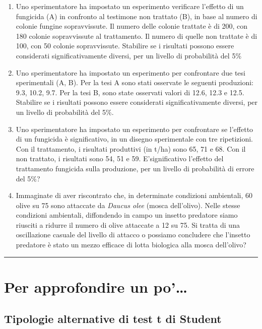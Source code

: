 \documentclass[a4paper,12pt,oneside]{book}
\providecommand{\tightlist}{%
  \setlength{\itemsep}{0pt}\setlength{\parskip}{0pt}}
\begin{document}
\begin{enumerate}
\def\labelenumi{\arabic{enumi}.}
\tightlist
\item
  Uno sperimentatore ha impostato un esperimento verificare l'effetto di un fungicida (A) in confronto al testimone non trattato (B), in base al numero di colonie fungine sopravvissute. Il numero delle colonie trattate è di 200, con 180 colonie sopravvissute al trattamento. Il numero di quelle non trattate è di 100, con 50 colonie sopravvissute. Stabilire se i risultati possono essere considerati significativamente diversi, per un livello di probabilità del 5\%
\item
  Uno sperimentatore ha impostato un esperimento per confrontare due tesi sperimentali (A, B). Per la tesi A sono stati osservate le seguenti produzioni: 9.3, 10.2, 9.7. Per la tesi B, sono state osservati valori di 12.6, 12.3 e 12.5. Stabilire se i risultati possono essere considerati significativamente diversi, per un livello di probabilità del 5\%.
\item
  Uno sperimentatore ha impostato un esperimento per confrontare se l'effetto di un fungicida è significativo, in un disegno sperimentale con tre ripetizioni. Con il trattamento, i risultati produttivi (in t/ha) sono 65, 71 e 68. Con il non trattato, i risultati sono 54, 51 e 59. E'significativo l'effetto del trattamento fungicida sulla produzione, per un livello di probabilità di errore del 5\%?
\item
  Immaginate di aver riscontrato che, in determinate condizioni ambientali, 60 olive su 75 sono attaccate da \emph{Daucus olee} (mosca dell'olivo). Nelle stesse condizioni ambientali, diffondendo in campo un insetto predatore siamo riusciti a ridurre il numero di olive attaccate a 12 su 75. Si tratta di una oscillazione casuale del livello di attacco o possiamo concludere che l'insetto predatore è stato un mezzo efficace di lotta biologica alla mosca dell'olivo?
\end{enumerate}

\begin{center}\rule{0.5\linewidth}{\linethickness}\end{center}

\hypertarget{per-approfondire-un-po-4}{%
\section{Per approfondire un po'\ldots{}}\label{per-approfondire-un-po-4}}

\hypertarget{tipologie-alternative-di-test-t-di-student}{%
\subsection{Tipologie alternative di test t di Student}\label{tipologie-alternative-di-test-t-di-student}}
\end{document}
